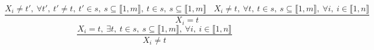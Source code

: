 $$\frac{X_{i} \neq t',~\forall t',~t' \neq t,~t' \in s,~s \subseteq \llbracket1,m\rrbracket,~t \in s,~s \subseteq \llbracket1,m\rrbracket~~~~X_{i} \neq t,~\forall t,~t \in s,~s \subseteq \llbracket1,m\rrbracket,~\forall i,~i \in \llbracket1,n\rrbracket}{X_{i}=t}$$ $$\frac{X_{i}=t,~\exists t,~t \in s,~s \subseteq \llbracket1,m\rrbracket,~\forall i,~i \in \llbracket1,n\rrbracket}{X_{i} \neq t}$$ 
